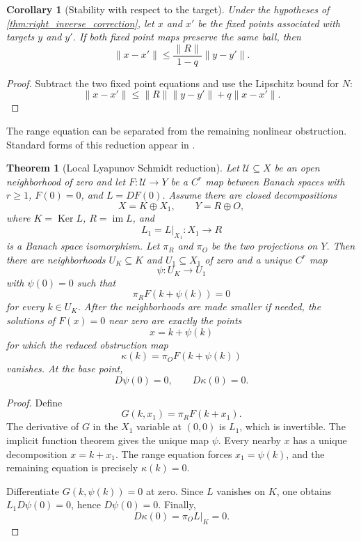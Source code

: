 \documentclass{aomart}
\newtheorem{theorem}{Theorem}[section]
\newtheorem{corollary}[corollary]{Corollary}
\theoremstyle{definition}
\theoremstyle{remark}
\newcommand{\im}{\operatorname{im}}
\newcommand{\Ker}{\operatorname{Ker}}
\begin{document}
\begin{corollary}[Stability with respect to the target]\label{cor:correction_stability}
Under the hypotheses of \cref{thm:right_inverse_correction}, let $x$ and $x'$ be the fixed points associated with targets $y$ and $y'$.  If both fixed point maps preserve the same ball, then
\[
\|x-x'\|
\le
\frac{\|R\|}{1-q}\|y-y'\|.
\]
\end{corollary}

\begin{proof}
Subtract the two fixed point equations and use the Lipschitz bound for $N$:
\[
\|x-x'\|
\le
\|R\|\|y-y'\|+q\|x-x'\|.
\]
\end{proof}

The range equation can be separated from the remaining nonlinear obstruction.  Standard forms of this reduction appear in \cite{Kielhoefer2012,Zeidler1986}.

\begin{theorem}[Local Lyapunov Schmidt reduction]\label{thm:lyapunov_schmidt}
Let $\mathcal U\subseteq X$ be an open neighborhood of zero and let $F:\mathcal U\to Y$ be a $C^r$ map between Banach spaces with $r\ge1$, $F(0)=0$, and $L=DF(0)$.  Assume there are closed decompositions
\[
X=K\oplus X_1,
\qquad
Y=R\oplus O,
\]
where $K=\Ker L$, $R=\im L$, and
\[
L_1=L|_{X_1}:X_1\longrightarrow R
\]
is a Banach space isomorphism.  Let $\pi_R$ and $\pi_O$ be the two projections on $Y$.  Then there are neighborhoods $U_K\subseteq K$ and $U_1\subseteq X_1$ of zero and a unique $C^r$ map
\[
\psi:U_K\longrightarrow U_1
\]
with $\psi(0)=0$ such that
\[
\pi_RF(k+\psi(k))=0
\]
for every $k\in U_K$.  After the neighborhoods are made smaller if needed, the solutions of $F(x)=0$ near zero are exactly the points
\[
x=k+\psi(k)
\]
for which the reduced obstruction map
\[
\kappa(k)=\pi_OF(k+\psi(k))
\]
vanishes.  At the base point,
\[
D\psi(0)=0,
\qquad
D\kappa(0)=0.
\]
\end{theorem}

\begin{proof}
Define
\[
G(k,x_1)=\pi_RF(k+x_1).
\]
The derivative of $G$ in the $X_1$ variable at $(0,0)$ is $L_1$, which is invertible.  The implicit function theorem gives the unique map $\psi$.  Every nearby $x$ has a unique decomposition $x=k+x_1$.  The range equation forces $x_1=\psi(k)$, and the remaining equation is precisely $\kappa(k)=0$.

Differentiate $G(k,\psi(k))=0$ at zero.  Since $L$ vanishes on $K$, one obtains $L_1D\psi(0)=0$, hence $D\psi(0)=0$.  Finally,
\[
D\kappa(0)=\pi_OL|_K=0.
\]
\end{proof}
\end{document}
